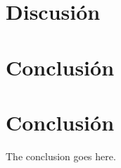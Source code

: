 \documentclass[journal]{IEEEtran}
\begin{document}
%

\section{Discusión}
\section{Conclusión}


\section{Conclusión}
The conclusion goes here.





\end{document}
